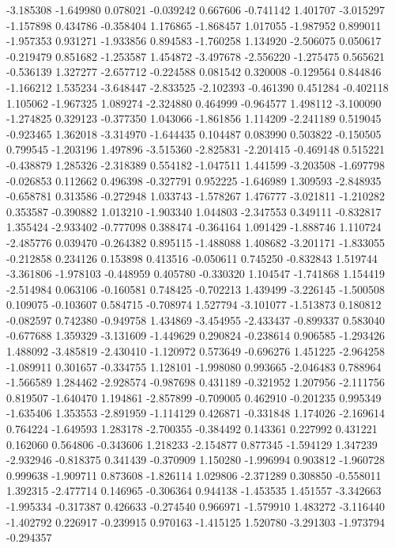 -3.185308
-1.649980
0.078021
-0.039242
0.667606
-0.741142
1.401707
-3.015297
-1.157898
0.434786
-0.358404
1.176865
-1.868457
1.017055
-1.987952
0.899011
-1.957353
0.931271
-1.933856
0.894583
-1.760258
1.134920
-2.506075
0.050617
-0.219479
0.851682
-1.253587
1.454872
-3.497678
-2.556220
-1.275475
0.565621
-0.536139
1.327277
-2.657712
-0.224588
0.081542
0.320008
-0.129564
0.844846
-1.166212
1.535234
-3.648447
-2.833525
-2.102393
-0.461390
0.451284
-0.402118
1.105062
-1.967325
1.089274
-2.324880
0.464999
-0.964577
1.498112
-3.100090
-1.274825
0.329123
-0.377350
1.043066
-1.861856
1.114209
-2.241189
0.519045
-0.923465
1.362018
-3.314970
-1.644435
0.104487
0.083990
0.503822
-0.150505
0.799545
-1.203196
1.497896
-3.515360
-2.825831
-2.201415
-0.469148
0.515221
-0.438879
1.285326
-2.318389
0.554182
-1.047511
1.441599
-3.203508
-1.697798
-0.026853
0.112662
0.496398
-0.327791
0.952225
-1.646989
1.309593
-2.848935
-0.658781
0.313586
-0.272948
1.033743
-1.578267
1.476777
-3.021811
-1.210282
0.353587
-0.390882
1.013210
-1.903340
1.044803
-2.347553
0.349111
-0.832817
1.355424
-2.933402
-0.777098
0.388474
-0.364164
1.091429
-1.888746
1.110724
-2.485776
0.039470
-0.264382
0.895115
-1.488088
1.408682
-3.201171
-1.833055
-0.212858
0.234126
0.153898
0.413516
-0.050611
0.745250
-0.832843
1.519744
-3.361806
-1.978103
-0.448959
0.405780
-0.330320
1.104547
-1.741868
1.154419
-2.514984
0.063106
-0.160581
0.748425
-0.702213
1.439499
-3.226145
-1.500508
0.109075
-0.103607
0.584715
-0.708974
1.527794
-3.101077
-1.513873
0.180812
-0.082597
0.742380
-0.949758
1.434869
-3.454955
-2.433437
-0.899337
0.583040
-0.677688
1.359329
-3.131609
-1.449629
0.290824
-0.238614
0.906585
-1.293426
1.488092
-3.485819
-2.430410
-1.120972
0.573649
-0.696276
1.451225
-2.964258
-1.089911
0.301657
-0.334755
1.128101
-1.998080
0.993665
-2.046483
0.788964
-1.566589
1.284462
-2.928574
-0.987698
0.431189
-0.321952
1.207956
-2.111756
0.819507
-1.640470
1.194861
-2.857899
-0.709005
0.462910
-0.201235
0.995349
-1.635406
1.353553
-2.891959
-1.114129
0.426871
-0.331848
1.174026
-2.169614
0.764224
-1.649593
1.283178
-2.700355
-0.384492
0.143361
0.227992
0.431221
0.162060
0.564806
-0.343606
1.218233
-2.154877
0.877345
-1.594129
1.347239
-2.932946
-0.818375
0.341439
-0.370909
1.150280
-1.996994
0.903812
-1.960728
0.999638
-1.909711
0.873608
-1.826114
1.029806
-2.371289
0.308850
-0.558011
1.392315
-2.477714
0.146965
-0.306364
0.944138
-1.453535
1.451557
-3.342663
-1.995334
-0.317387
0.426633
-0.274540
0.966971
-1.579910
1.483272
-3.116440
-1.402792
0.226917
-0.239915
0.970163
-1.415125
1.520780
-3.291303
-1.973794
-0.294357
